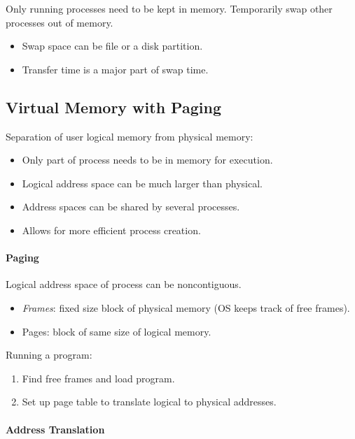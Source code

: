 \documentclass[twocolumn,english]{article}
\begin{document}
Only running processes need to be kept in memory. Temporarily swap
other processes out of memory.
\begin{itemize}
\item Swap space can be file or a disk partition.
\item Transfer time is a major part of swap time.
\end{itemize}

\subsection{Virtual Memory with Paging}

Separation of user logical memory from physical memory:
\begin{itemize}
\item Only part of process needs to be in memory for execution.
\item Logical address space can be much larger than physical.
\item Address spaces can be shared by several processes.
\item Allows for more efficient process creation.
\end{itemize}

\paragraph{Paging}

Logical address space of process can be noncontiguous.
\begin{itemize}
\item \emph{Frames}: fixed size block of physical memory (OS keeps track
of free frames).
\item Pages: block of same size of logical memory.
\end{itemize}
Running a program:
\begin{enumerate}
\item Find free frames and load program.
\item Set up page table to translate logical to physical addresses.
\end{enumerate}

\paragraph{Address Translation}
\end{document}
